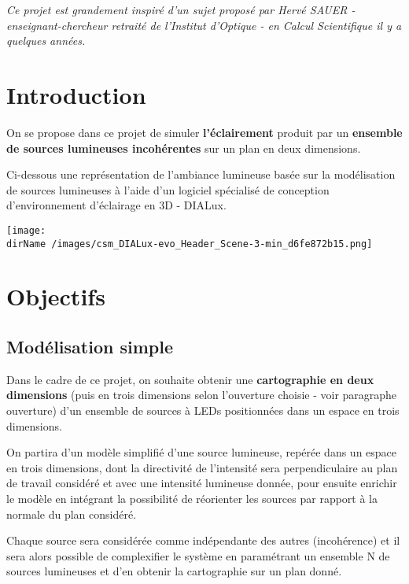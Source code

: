 
\textit{Ce projet est grandement inspiré d'un sujet proposé par \textit{Hervé SAUER} - enseignant-chercheur retraité de l'Institut d'Optique - en Calcul Scientifique il y a quelques années.}

\section{Introduction}

On se propose dans ce projet de simuler \textbf{l'éclairement} produit par un \textbf{ensemble de sources lumineuses incohérentes} sur un plan en deux dimensions.

\medskip

Ci-dessous une représentation de l'ambiance lumineuse basée sur la modélisation de sources lumineuses à l'aide d'un logiciel spécialisé de conception d'environnement d'éclairage en 3D - DIALux.

\begin{center}
	\texttt{[image:  \\dirName /images/csm\_DIALux-evo\_Header\_Scene-3-min\_d6fe872b15.png]}
\end{center}


\section{Objectifs}

\subsection{Modélisation simple}

Dans le cadre de ce projet, on souhaite obtenir une \textbf{cartographie en deux dimensions} (puis en trois dimensions selon l'ouverture choisie - voir paragraphe ouverture) d'un ensemble de sources à LEDs positionnées dans un espace en trois dimensions.

On partira d'un modèle simplifié d'une source lumineuse, repérée dans un espace en trois dimensions, dont la directivité de l'intensité sera perpendiculaire au plan de travail considéré et avec une intensité lumineuse donnée, pour ensuite enrichir le modèle en intégrant la possibilité de réorienter les sources par rapport à la normale du plan considéré.

Chaque source sera considérée comme indépendante des autres (incohérence) et il sera alors possible de complexifier le système en paramétrant un ensemble N de sources lumineuses et d'en obtenir la cartographie sur un plan donné.

